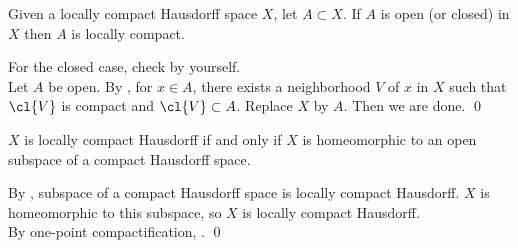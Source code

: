  Given a locally compact Hausdorff space \(X\), let \(A \subset X\). If \(A\) is open (or closed) in \(X\) then \(A\) is locally compact.

\pf For the closed case, check by yourself. \\
Let \(A\) be open. By , for \(x \in A\), there exists a neighborhood \(V\) of \(x\) in \(X\) such that \(\cl{V}\) is compact and \(\cl{V} \subset A\). Replace \(X\) by \(A\). Then we are done. \qed

 \(X\) is locally compact Hausdorff if and only if \(X\) is homeomorphic to an open subspace of a compact Hausdorff space.

\pf \note{\mimpd} By , subspace of a compact Hausdorff space is locally compact Hausdorff. \(X\) is homeomorphic to this subspace, so \(X\) is locally compact Hausdorff. \\
\note{\mimp} By one-point compactification, . \qed

\pagebreak
